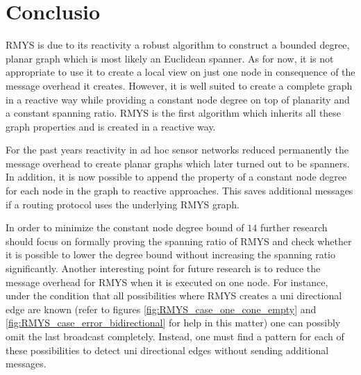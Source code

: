 \section{Conclusio}
RMYS is due to its reactivity a robust algorithm to construct a bounded degree, planar graph which is most likely an Euclidean spanner.
As for now, it is not appropriate to use it to create a local view on just one node in consequence of the message overhead it creates.
However, it is well suited to create a complete graph in a reactive way while providing a constant node degree on top of planarity and a constant spanning ratio.
RMYS is the first algorithm which inherits all these graph properties and is created in a reactive way.

For the past years reactivity in ad hoc sensor networks reduced permanently the message overhead to create planar graphs which later turned out to be spanners.
In addition, it is now possible to append the property of a constant node degree for each node in the graph to reactive approaches.
This saves additional messages if a routing protocol uses the underlying RMYS graph.

In order to minimize the constant node degree bound of $14 $ further research should focus on formally proving the spanning ratio of RMYS and check whether it is possible to lower the degree bound without increasing the spanning ratio significantly.
Another interesting point for future research is to reduce the message overhead for RMYS when it is executed on one node.
For instance, under the condition that all possibilities where RMYS creates a uni directional edge are known (refer to figures \ref{fig:RMYS_case_one_cone_empty} and \ref{fig:RMYS_case_error_bidirectional} for help in this matter) one can possibly omit the last broadcast completely.
Instead, one must find a pattern for each of these possibilities to detect uni directional edges without sending additional messages.